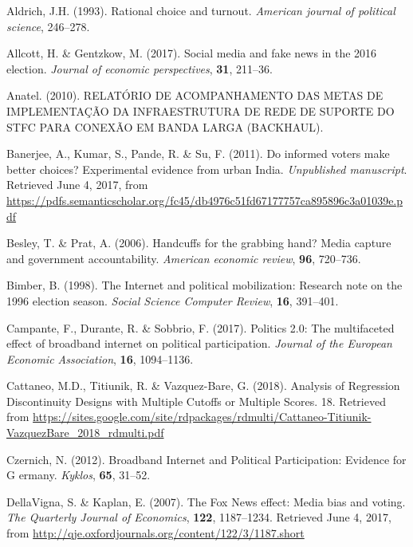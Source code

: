 \documentclass[
  12pt,
]{article}
\begin{document}
\hypertarget{refs}{}
\leavevmode\hypertarget{ref-aldrich_rational_1993}{}%
Aldrich, J.H. (1993). Rational choice and turnout. \emph{American
journal of political science}, 246--278.

\leavevmode\hypertarget{ref-allcott_social_2017}{}%
Allcott, H. \& Gentzkow, M. (2017). Social media and fake news in the
2016 election. \emph{Journal of economic perspectives}, \textbf{31},
211--36.

\leavevmode\hypertarget{ref-anatel_relatorio_2010}{}%
Anatel. (2010). RELATÓRIO DE ACOMPANHAMENTO DAS METAS DE IMPLEMENTAÇÃO
DA INFRAESTRUTURA DE REDE DE SUPORTE DO STFC PARA CONEXÃO EM BANDA LARGA
(BACKHAUL).

\leavevmode\hypertarget{ref-banerjee_informed_2011}{}%
Banerjee, A., Kumar, S., Pande, R. \& Su, F. (2011). Do informed voters
make better choices? Experimental evidence from urban India.
\emph{Unpublished manuscript}. Retrieved June 4, 2017, from
\url{https://pdfs.semanticscholar.org/fc45/db4976c51fd67177757ca895896c3a01039e.pdf}

\leavevmode\hypertarget{ref-besley_handcuffs_2006}{}%
Besley, T. \& Prat, A. (2006). Handcuffs for the grabbing hand? Media
capture and government accountability. \emph{American economic review},
\textbf{96}, 720--736.

\leavevmode\hypertarget{ref-bimber_internet_1998}{}%
Bimber, B. (1998). The Internet and political mobilization: Research
note on the 1996 election season. \emph{Social Science Computer Review},
\textbf{16}, 391--401.

\leavevmode\hypertarget{ref-campante_politics_2017}{}%
Campante, F., Durante, R. \& Sobbrio, F. (2017). Politics 2.0: The
multifaceted effect of broadband internet on political participation.
\emph{Journal of the European Economic Association}, \textbf{16},
1094--1136.

\leavevmode\hypertarget{ref-cattaneo_analysis_2018}{}%
Cattaneo, M.D., Titiunik, R. \& Vazquez-Bare, G. (2018). Analysis of
Regression Discontinuity Designs with Multiple Cutoffs or Multiple
Scores. 18. Retrieved from
\url{https://sites.google.com/site/rdpackages/rdmulti/Cattaneo-Titiunik-VazquezBare_2018_rdmulti.pdf}

\leavevmode\hypertarget{ref-czernich_broadband_2012}{}%
Czernich, N. (2012). Broadband Internet and Political Participation:
Evidence for G ermany. \emph{Kyklos}, \textbf{65}, 31--52.

\leavevmode\hypertarget{ref-dellavigna_fox_2007}{}%
DellaVigna, S. \& Kaplan, E. (2007). The Fox News effect: Media bias and
voting. \emph{The Quarterly Journal of Economics}, \textbf{122},
1187--1234. Retrieved June 4, 2017, from
\url{http://qje.oxfordjournals.org/content/122/3/1187.short}
\end{document}
